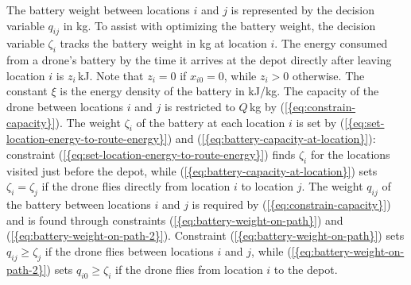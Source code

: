 \documentclass[journal]{IEEEtran}
\begin{document}
The battery weight between locations $i$ and $j$ is represented by the decision variable ${\ensuremath{q_{{i} {j}}}}$ in kg. To assist with optimizing the battery weight, the decision variable ${\ensuremath{\zeta_{{i}}}}$ tracks the battery weight in kg at location $i$. The energy consumed from a drone's battery by the time it arrives at the depot directly after leaving location $i$ is ${\ensuremath{z_{{i}}}}$\,kJ. Note that ${\ensuremath{z_{{i}}}}=0$ if ${\ensuremath{x_{{i} {0}}}}=0$, while ${\ensuremath{z_{{i}}}}>0$ otherwise. The constant ${\ensuremath{\xi}}$ is the energy density of the battery in kJ/kg. The capacity of the drone between locations $i$ and $j$ is restricted to ${\ensuremath{Q}}$\,kg by {(\ref{{eq:constrain-capacity}})}. The weight ${\ensuremath{\zeta_{{i}}}}$ of the battery at each location $i$ is set by {(\ref{{eq:set-location-energy-to-route-energy}})} and {(\ref{{eq:battery-capacity-at-location}})}: constraint {(\ref{{eq:set-location-energy-to-route-energy}})} finds ${\ensuremath{\zeta_{{i}}}}$ for the locations visited just before the depot, while {(\ref{{eq:battery-capacity-at-location}})} sets ${\ensuremath{\zeta_{{i}}}}={\ensuremath{\zeta_{{j}}}}$ if the drone flies directly from location $i$ to location $j$. The weight ${\ensuremath{q_{{i} {j}}}}$ of the battery between locations $i$ and $j$ is required by {(\ref{{eq:constrain-capacity}})} and is found through constraints {(\ref{{eq:battery-weight-on-path}})} and {(\ref{{eq:battery-weight-on-path-2}})}. Constraint {(\ref{{eq:battery-weight-on-path}})} sets ${\ensuremath{q_{{i} {j}}}} \geq {\ensuremath{\zeta_{{j}}}}$ if the drone flies between locations $i$ and $j$, while {(\ref{{eq:battery-weight-on-path-2}})} sets ${\ensuremath{q_{{i} {0}}}} \geq {\ensuremath{\zeta_{{i}}}}$ if the drone flies from location $i$ to the depot.
\end{document}
